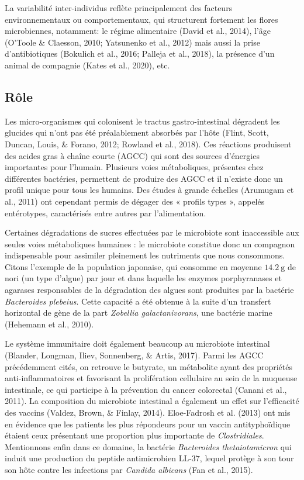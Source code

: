 \documentclass[12pt,a4paper]{reedthesis}
\theoremstyle{definition}
\theoremstyle{definition}
\theoremstyle{definition}
\theoremstyle{remark}
\begin{document}
La variabilité inter-individus reflète principalement des facteurs environnementaux ou comportementaux, qui structurent fortement les flores microbiennes, notamment: le régime alimentaire (David et al., 2014), l'âge (O'Toole \& Claesson, 2010; Yatsunenko et al., 2012) mais aussi la prise d'antibiotiques (Bokulich et al., 2016; Palleja et al., 2018), la présence d'un animal de compagnie (Kates et al., 2020), etc.

\hypertarget{ruxf4le}{%
\subsection{Rôle}\label{ruxf4le}}

Les micro-organismes qui colonisent le tractus gastro-intestinal dégradent les glucides qui n'ont pas été préalablement absorbés par l'hôte (Flint, Scott, Duncan, Louis, \& Forano, 2012; Rowland et al., 2018). Ces réactions produisent des acides gras à chaîne courte (AGCC) qui sont des sources d'énergies importantes pour l'humain. Plusieurs voies métaboliques, présentes chez différentes bactéries, permettent de produire des AGCC et il n'existe donc un profil unique pour tous les humains. Des études à grande échelles (Arumugam et al., 2011) ont cependant permis de dégager des « profils types », appelés entérotypes, caractérisés entre autres par l'alimentation.

Certaines dégradations de sucres effectuées par le microbiote sont inaccessible aux seules voies métaboliques humaines : le microbiote constitue donc un compagnon indispensable pour assimiler pleinement les nutriments que nous consommons. Citons l'exemple de la population japonaise, qui consomme en moyenne \(14.2~\text{g}\) de nori (un type d'algue) par jour et dans laquelle les enzymes porphyranases et agarases responsables de la dégradation des algues sont produites par la bactérie \emph{Bacteroides plebeius}. Cette capacité a été obtenue à la suite d'un transfert horizontal de gène de la part \emph{Zobellia galactanivorans}, une bactérie marine (Hehemann et al., 2010).

Le système immunitaire doit également beaucoup au microbiote intestinal (Blander, Longman, Iliev, Sonnenberg, \& Artis, 2017). Parmi les AGCC précédemment cités, on retrouve le butyrate, un métabolite ayant des propriétés anti-inflammatoires et favorisant la prolifération cellulaire au sein de la muqueuse intestinale, ce qui participe à la prévention du cancer colorectal (Canani et al., 2011).
La composition du microbiote intestinal a également un effet sur l'efficacité des vaccins (Valdez, Brown, \& Finlay, 2014). Eloe-Fadrosh et al. (2013) ont mis en évidence que les patients les plus répondeurs pour un vaccin antityphoïdique étaient ceux présentant une proportion plus importante de \emph{Clostridiales}. Mentionnons enfin dans ce domaine, la bactérie \emph{Bacteroides thetaiotamicron} qui induit une production du peptide antimicrobien \(\text{LL-37}\), lequel protège à son tour son hôte contre les infections par \emph{Candida albicans} (Fan et al., 2015).
\end{document}
